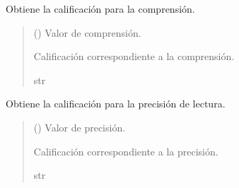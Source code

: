 \documentclass[letterpaper,10pt,spanish]{sphinxmanual}
\begin{document}
\begin{fulllineitems}
\begin{fulllineitems}
\end{fulllineitems}



\begin{fulllineitems}

\pysigstartsignatures
{}
\pysigstopsignatures
\sphinxAtStartPar
Obtiene la calificación para la comprensión.
\begin{quote}\begin{description}
\sphinxAtStartPar
{} () \textendash{} Valor de comprensión.

\sphinxAtStartPar
Calificación correspondiente a la comprensión.

\sphinxAtStartPar
str

\end{description}\end{quote}

\end{fulllineitems}



\begin{fulllineitems}

\pysigstartsignatures
{}
\pysigstopsignatures
\sphinxAtStartPar
Obtiene la calificación para la precisión de lectura.
\begin{quote}\begin{description}
\sphinxAtStartPar
{} () \textendash{} Valor de precisión.

\sphinxAtStartPar
Calificación correspondiente a la precisión.

\sphinxAtStartPar
str

\end{description}\end{quote}

\end{fulllineitems}



\begin{fulllineitems}


\end{fulllineitems}
\end{fulllineitems}
\end{document}
